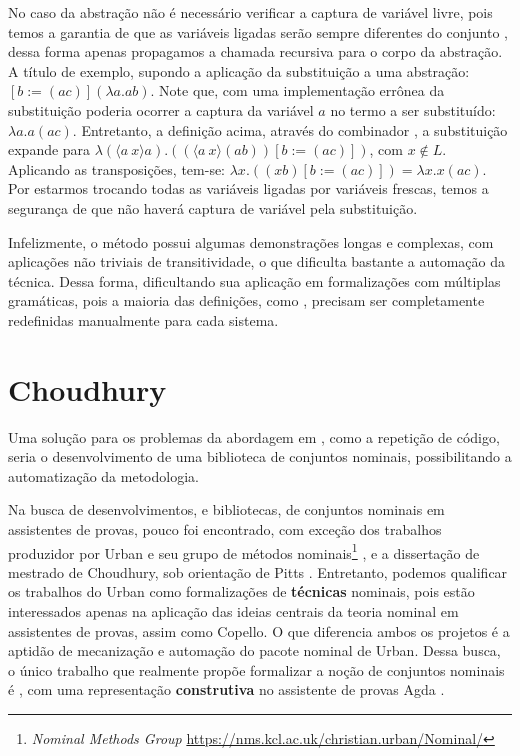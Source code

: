 No caso da abstração não é necessário verificar a captura de variável livre, pois temos a garantia de que as variáveis ligadas serão sempre diferentes do conjunto , dessa forma apenas propagamos a chamada recursiva para o corpo da abstração. A título de exemplo, supondo a aplicação da substituição a uma abstração: $[b := (ac)](\lambda a . ab)$. Note que, com uma implementação errônea da substituição poderia ocorrer a captura da variável $a$ no termo a ser substituído: $\lambda a . a(ac)$. Entretanto, a definição acima, através do combinador , a substituição expande para $\lambda (\langle a~x \rangle a) . ((\langle a~x \rangle (ab))[b := (ac)])$, com $x \notin L$. Aplicando as transposições, tem-se: $\lambda x . ((xb)[b := (ac)]) = \lambda x . x(ac)$. Por estarmos trocando todas as variáveis ligadas por variáveis frescas, temos a segurança de que não haverá captura de variável pela substituição. 

Infelizmente, o método possui algumas demonstrações longas e complexas, com aplicações não triviais de transitividade, o que dificulta bastante a automação da técnica. Dessa forma, dificultando sua aplicação em formalizações com múltiplas gramáticas, pois a maioria das definições, como , precisam ser completamente redefinidas manualmente para cada sistema.

\section{Choudhury}\label{sec:choudhury}
Uma solução para os problemas da abordagem em \cite{Copello2016}, como a repetição de código, seria o desenvolvimento de uma biblioteca de conjuntos nominais, possibilitando a automatização da metodologia.

Na busca de desenvolvimentos, e bibliotecas, de conjuntos nominais em assistentes de provas, pouco foi encontrado, com exceção dos trabalhos produzidor por Urban e seu grupo de métodos nominais\footnote{\textit{Nominal Methods Group} \url{https://nms.kcl.ac.uk/christian.urban/Nominal/}} \cite{Urban2008,Urban2005,Urban2006,Huffman2010,Urban2011}, e a dissertação de mestrado de Choudhury, sob orientação de Pitts \cite{Choudhury2015}. Entretanto,
podemos qualificar os trabalhos do Urban como formalizações de \textbf{técnicas} nominais, pois estão interessados apenas na aplicação das ideias centrais da teoria nominal em assistentes de provas, assim como Copello. O que diferencia ambos os projetos é a aptidão de mecanização e automação do pacote nominal de Urban. Dessa busca, o único trabalho que realmente propõe formalizar a noção de conjuntos nominais é \cite{Choudhury2015}, com uma representação \textbf{construtiva} no assistente de provas Agda \cite{Bove2009}.


